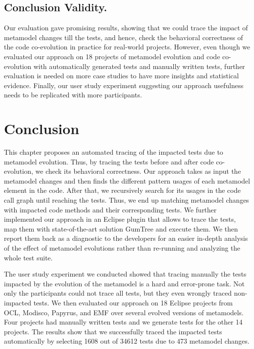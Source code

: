 \subsection{Conclusion Validity.}
Our evaluation gave promising results, showing that we could trace the impact of metamodel changes till the tests, and hence, check the behavioral correctness of the code co-evolution in practice for real-world projects. 
However, even though we evaluated our approach on 18 projects of metamodel evolution and code co-evolution with automatically generated tests and manually written tests, further evaluation is needed on more case studies to have more insights and statistical evidence. Finally, our user study experiment suggesting our approach usefulness needs to be replicated with more participants.

\section{Conclusion}
\label{sec_conclusion}
This chapter proposes an automated tracing of the impacted tests due to metamodel evolution. Thus, by tracing the tests before and after code co-evolution, we check its behavioral correctness. 
Our approach takes as input the metamodel changes and then finds the different pattern usages of each metamodel element in the code. 
After that, we recursively search for its usages in the code call graph until reaching the tests. Thus, we end up matching metamodel changes with impacted code methods and their corresponding tests. 
%
We further implemented our approach in an Eclipse plugin that allows to trace the tests, map them with state-of-the-art solution GumTree and execute them. We then report them back as a diagnostic to the developers for an easier in-depth analysis of the effect of metamodel evolutions rather than re-running and analyzing the whole test suite.

The user study experiment we conducted showed that tracing manually the tests impacted by the evolution of the metamodel is a hard and error-prone task. Not only the participants could not trace all tests, but they even wrongly traced non-impacted tests.  
	We then evaluated our approach on 18 Eclipse projects from OCL, Modisco, Papyrus, and EMF over several evolved versions of metamodels. Four projects had manually written tests and we generate tests for the other 14 projects. 
	The results show that we successfully traced the impacted tests automatically by selecting 1608 out of 34612 tests due to 473 metamodel changes. 
	
